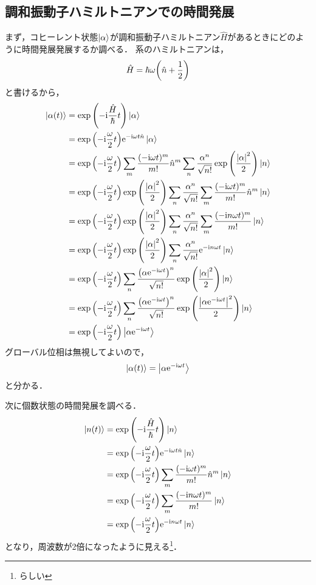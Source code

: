\documentclass{report}
\begin{document}
  \subsection{調和振動子ハミルトニアンでの時間発展}
    まず，コヒーレント状態$\ket{\alpha}$が調和振動子ハミルトニアン$\hat{H}$があるときにどのように時間発展発展するか調べる．
    系のハミルトニアンは，
    \begin{align}
      \hat{H} = \hbar\omega\qty(\hat{n} + \frac{1}{2})
    \end{align}
    と書けるから，
    \begin{align}
      \ket{\alpha(t)} &= \exp\qty(-\mathrm{i}\frac{\hat{H}}{\hbar}t)\ket{\alpha} \\ 
      &= \exp\qty(-\mathrm{i}\frac{\omega}{2}t)\mathrm{e}^{-\mathrm{i}\omega t \hat{n}}\ket{\alpha} \\ 
      &= \exp\qty(-\mathrm{i}\frac{\omega}{2}t)\sum_{m}\frac{(-\mathrm{i}\omega t)^m}{m!}\hat{n}^m \sum_{n}\frac{\alpha^n}{\sqrt{n!}}\exp\qty(\frac{\abs{\alpha}^2}{2})\ket{n} \\ 
      &= \exp\qty(-\mathrm{i}\frac{\omega}{2}t)\exp\qty(\frac{\abs{\alpha}^2}{2}) \sum_{n}\frac{\alpha^n}{\sqrt{n!}}\sum_{m}\frac{(-\mathrm{i}\omega t)^m}{m!}\hat{n}^m\ket{n} \\ 
      &= \exp\qty(-\mathrm{i}\frac{\omega}{2}t)\exp\qty(\frac{\abs{\alpha}^2}{2}) \sum_{n}\frac{\alpha^n}{\sqrt{n!}}\sum_{m}\frac{(-\mathrm{i} n\omega t)^m}{m!} \ket{n} \\ 
      &= \exp\qty(-\mathrm{i}\frac{\omega}{2}t)\exp\qty(\frac{\abs{\alpha}^2}{2}) \sum_{n}\frac{\alpha^n}{\sqrt{n!}}\mathrm{e}^{-\mathrm{i} n\omega t}\ket{n} \\ 
      &= \exp\qty(-\mathrm{i}\frac{\omega}{2}t) \sum_{n}\frac{\qty(\alpha\mathrm{e}^{-\mathrm{i}\omega t})^n}{\sqrt{n!}}\exp\qty(\frac{\abs{\alpha}^2}{2})\ket{n} \\ 
      &= \exp\qty(-\mathrm{i}\frac{\omega}{2}t) \sum_{n}\frac{\qty(\alpha\mathrm{e}^{-\mathrm{i}\omega t})^n}{\sqrt{n!}}\exp\qty(\frac{\abs{\alpha\mathrm{e}^{-\mathrm{i}\omega t}}^2}{2})\ket{n} \\ 
      &= \exp\qty(-\mathrm{i}\frac{\omega}{2}t)\ket{\alpha\mathrm{e}^{-\mathrm{i}\omega t}}
    \end{align}
    グローバル位相は無視してよいので，
    \begin{align}
      \ket{\alpha(t)} = \ket{\alpha\mathrm{e}^{-\mathrm{i}\omega t}}
    \end{align}
    と分かる．
    \par
    次に個数状態の時間発展を調べる．
    \begin{align}
      \ket{n(t)} &= \exp\qty(-\mathrm{i}\frac{\hat{H}}{\hbar}t)\ket{n} \\ 
      &= \exp\qty(-\mathrm{i}\frac{\omega}{2}t)\mathrm{e}^{-\mathrm{i}\omega t \hat{n}}\ket{n} \\ 
      &= \exp\qty(-\mathrm{i}\frac{\omega}{2}t)\sum_{m}\frac{(-\mathrm{i}\omega t)^m}{m!}\hat{n}^m \ket{n} \\ 
      &= \exp\qty(-\mathrm{i}\frac{\omega}{2}t)\sum_{m}\frac{(-\mathrm{i} n\omega t)^m}{m!} \ket{n} \\ 
      &= \exp\qty(-\mathrm{i}\frac{\omega}{2}t)\mathrm{e}^{-\mathrm{i} n\omega t} \ket{n}
    \end{align}
    となり，周波数が2倍になったように見える\footnote{らしい}．
\end{document}
